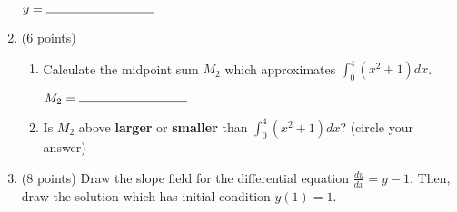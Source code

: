 \documentclass[11pt]{article}
\begin{document}
\begin{enumerate}[itemsep=30pt]
\vspace{80pt}
\begin{flushright}
$y = \rule{3cm}{0.4pt}$
\end{flushright}

\vspace{20pt}

\newpage


\item (6 points) 
\begin{enumerate}[itemsep=10pt]
\item Calculate the midpoint sum $M_{2}$ which approximates $\int_{0}^{4} (x^2+1)dx$. 
\vspace{150pt}
\begin{flushright}
$M_2 = \rule{3cm}{0.4pt}$
\end{flushright}
\vspace{20pt}
\item Is $M_2$ above \textbf{larger} or \textbf{smaller} than $\int_{0}^{4} (x^2+1)dx$? (circle your answer)
\end{enumerate}
	

\item (8 points) Draw the slope field for the differential equation $\frac{dy}{dx} = y - 1$. Then, draw the solution which has initial condition $y(1) = 1$.

\begin{center}
\end{center}

\end{enumerate}
\end{document}
